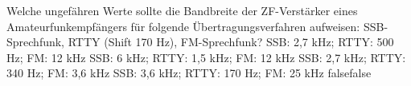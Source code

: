     {Welche ungefähren Werte sollte die Bandbreite der ZF-Verstärker eines Amateurfunkempfängers für folgende Übertragungsverfahren aufweisen: SSB-Sprechfunk, RTTY (Shift 170 Hz), FM-Sprechfunk?}
    {SSB: 2,7 kHz; RTTY: 500 Hz; FM: 12 kHz}
    {SSB: 6 kHz; RTTY: 1,5 kHz; FM: 12 kHz}
    {SSB: 2,7 kHz; RTTY: 340 Hz; FM: 3,6 kHz}
    {SSB: 3,6 kHz; RTTY: 170 Hz; FM: 25 kHz}
    {false}{false}